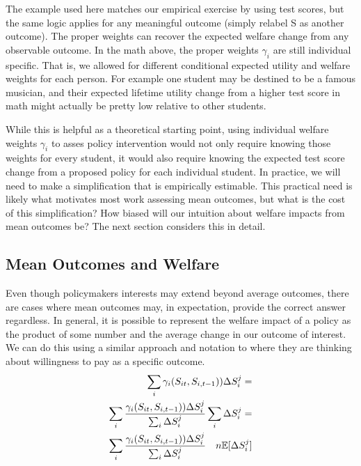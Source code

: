 \documentclass[12pt]{article}
\theoremstyle{definition}
\theoremstyle{definition}
\theoremstyle{definition}
\theoremstyle{definition}
\begin{document}
  The example used here matches our empirical exercise by using test scores, but the same logic applies for any meaningful outcome (simply relabel S as another outcome). The proper weights can recover the expected welfare change from any  observable outcome. In the math above, the proper weights  $\gamma_i$ are still individual specific. That is, we allowed for different conditional expected utility and welfare weights for each person. For example one student may be destined to be a famous musician, and their expected lifetime utility change from a higher test score in math might actually be pretty low relative to other students. 
    
    While this is helpful as a theoretical starting point, using individual welfare weights  $\gamma_i$ to asses policy intervention would not only require knowing those weights for every student, it would also require knowing the expected test score change from a proposed policy for each individual student. In practice, we will need to make a simplification that is empirically estimable. This practical need is likely what motivates most work assessing mean outcomes, but what is the cost of this simplification? How biased will our intuition about welfare impacts from mean outcomes be? The next section considers this in detail. 
    
    
    \subsection{Mean Outcomes and Welfare}
    
    Even though policymakers interests may extend beyond average outcomes, there are cases where mean outcomes may, in expectation, provide the correct answer regardless. In general, it is possible to represent the welfare impact of a policy as the product of some number and the average change in our outcome of interest. We can do this using a similar approach and notation to \cite{Keyser_2020} where they are thinking about willingness to pay as a specific outcome.
    \begin{align}
       \sum_i \gamma_i(S_{it}, S_{i,t-1})) \Delta S_i^j =&
       \\ \sum_i \frac{\gamma_i(S_{it}, S_{i,t-1}))\Delta S_i^j}{\sum_i \Delta S_i^j} \sum_i \Delta S_i^j =&
       \\ \sum_i \frac{\gamma_i(S_{it}, S_{i,t-1}))\Delta S_i^j}{\sum_i \Delta S_i^j} \quad n \mathbb{E}[\Delta S_i^j]   \label{eq_hendren}
    \end{align}
\end{document}
